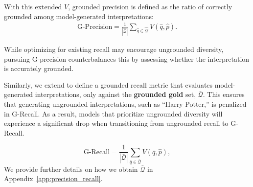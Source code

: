 With this extended $V$,
grounded precision is defined as
the ratio of correctly grounded
among model-generated interpretations:
\begin{align}
\mathrm{G\text{-}Precision} = \frac{1}{|\hat{\mathcal{Q}}|} \sum_{\hat{q}\in \hat{\mathcal{Q}}} V(\hat{q}, \hat{p}).
\label{eq:def_precision}
\end{align}


While optimizing for existing recall may encourage ungrounded diversity, pursuing G-precision counterbalances this by assessing whether the interpretation is accurately grounded. 

Similarly, we extend  to define a grounded recall metric that evaluates model-generated interpretations,  only against the \textbf{grounded gold} set, $\bar{\mathcal{Q}}$. This ensures that generating ungrounded interpretations, such as “Harry Potter,” is penalized in G-Recall. As a result, models that prioritize ungrounded diversity will experience a significant drop when transitioning from ungrounded recall to G-Recall.






\begin{equation}
\mathrm{G\text{-}Recall} = \frac{1}{|\bar{\mathcal{Q}}|} \sum_{\bar{q} \in \bar{\mathcal{Q}}} V(\bar{q}, \hat{p}),
\label{eq:def_recall}
\end{equation}
We provide further details on how we obtain $\bar{\mathcal{Q}}$ in Appendix~\ref{app:precision_recall}.











